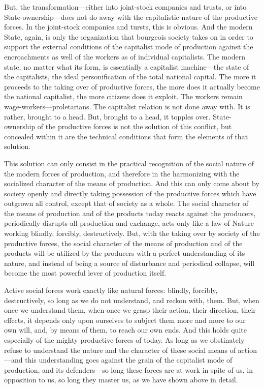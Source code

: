 But, the transformation---either into joint-stock companies and trusts, or into
State-ownership---does not do away with the capitalistic nature of the
productive forces. In the joint-stock companies and tursts, this is obvious. And
the modern State, again, is only the organization that bourgeois society takes
on in order to support the external conditions of the capitalist mode of
production against the encroachments as well of the workers as of individual
capitalists. The modern state, no matter what its form, is essentially a
capitalist machine---the state of the capitalists, the ideal personification of
the total national capital. The more it proceeds to the taking over of
productive forces, the more does it actually become the national capitalist, the
more citizens does it exploit. The workers remain wage-workers---proletarians.
The capitalist relation is not done away with. It is rather, brought to a head.
But, brought to a head, it topples over. State-ownership of the productive
forces is not the solution of this conflict, but concealed within it are the
technical conditions that form the elements of that solution.

This solution can only consist in the practical recognition of the social nature
of the modern forces of production, and therefore in the harmonizing with the
socialized character of the means of production. And this can only come about
by society openly and directly taking possession of the productive forces which
have outgrown all control, except that of society as a whole. The social
character of the means of production and of the products today reacts against
the producers, periodically disrupts all production and exchange, acts only
like a law of Nature working blindly, forcibly, destructively. But, with the
taking over by society of the productive forces, the social character of the
means of production and of the products will be utilized by the producers with a
perfect understanding of its nature, and instead of being a source of
disturbance and periodical collapse, will become the most powerful lever of
production itself. 

Active social forces work exactly like natural forces: blindly, forcibly,
destructively, so long as we do not understand, and reckon with, them. But, when
once we understand them, when once we grasp their action, their direction, their
effects, it depends only upon ourselves to subject them more and more to our own
will, and, by means of them, to reach our own ends. And this holds quite
especially of the mighty productive forces of today. As long as we obstinately
refuse to understand the nature and the character of these social means of
action---and this understanding goes against the grain of the capitalist mode of
production, and its defenders---so long these forces are at work in spite of us,
in opposition to us, so long they master us, as we have shown above in detail.

